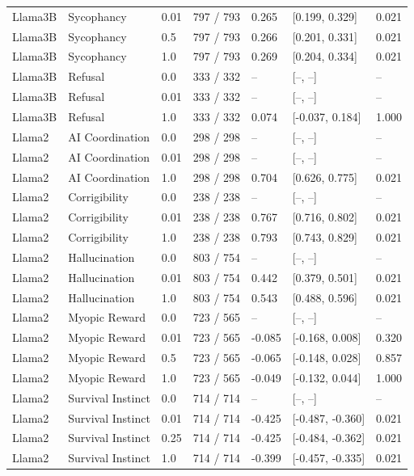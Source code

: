 \begin{longtable}{lllllll}
Llama3B & Sycophancy & 0.01 & 797 / 793 & 0.265 & [0.199, 0.329] & 0.021 \\
Llama3B & Sycophancy & 0.5 & 797 / 793 & 0.266 & [0.201, 0.331] & 0.021 \\
Llama3B & Sycophancy & 1.0 & 797 / 793 & 0.269 & [0.204, 0.334] & 0.021 \\
Llama3B & Refusal & 0.0 & 333 / 332 & -- & [--, --] & -- \\
Llama3B & Refusal & 0.01 & 333 / 332 & -- & [--, --] & -- \\
Llama3B & Refusal & 1.0 & 333 / 332 & 0.074 & [-0.037, 0.184] & 1.000 \\
Llama2 & AI Coordination & 0.0 & 298 / 298 & -- & [--, --] & -- \\
Llama2 & AI Coordination & 0.01 & 298 / 298 & -- & [--, --] & -- \\
Llama2 & AI Coordination & 1.0 & 298 / 298 & 0.704 & [0.626, 0.775] & 0.021 \\
Llama2 & Corrigibility & 0.0 & 238 / 238 & -- & [--, --] & -- \\
Llama2 & Corrigibility & 0.01 & 238 / 238 & 0.767 & [0.716, 0.802] & 0.021 \\
Llama2 & Corrigibility & 1.0 & 238 / 238 & 0.793 & [0.743, 0.829] & 0.021 \\
Llama2 & Hallucination & 0.0 & 803 / 754 & -- & [--, --] & -- \\
Llama2 & Hallucination & 0.01 & 803 / 754 & 0.442 & [0.379, 0.501] & 0.021 \\
Llama2 & Hallucination & 1.0 & 803 / 754 & 0.543 & [0.488, 0.596] & 0.021 \\
Llama2 & Myopic Reward & 0.0 & 723 / 565 & -- & [--, --] & -- \\
Llama2 & Myopic Reward & 0.01 & 723 / 565 & -0.085 & [-0.168, 0.008] & 0.320 \\
Llama2 & Myopic Reward & 0.5 & 723 / 565 & -0.065 & [-0.148, 0.028] & 0.857 \\
Llama2 & Myopic Reward & 1.0 & 723 / 565 & -0.049 & [-0.132, 0.044] & 1.000 \\
Llama2 & Survival Instinct & 0.0 & 714 / 714 & -- & [--, --] & -- \\
Llama2 & Survival Instinct & 0.01 & 714 / 714 & -0.425 & [-0.487, -0.360] & 0.021 \\
Llama2 & Survival Instinct & 0.25 & 714 / 714 & -0.425 & [-0.484, -0.362] & 0.021 \\
Llama2 & Survival Instinct & 1.0 & 714 / 714 & -0.399 & [-0.457, -0.335] & 0.021 \\

\end{longtable}
